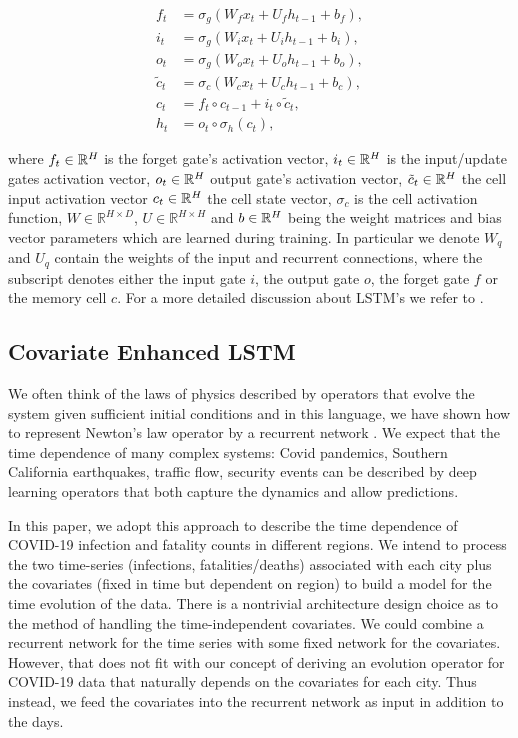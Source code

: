\documentclass[a4paper, inpress]{jds} %
\renewcommand{\_}{%
    \textunderscore\hspace{0pt}%
}
\begin{document}
\begin{align}
    f_t &= \sigma_g(W_f x_t + U_f h_{t-1} + b_f), \label{eq:first} \\
    i_t &= \sigma_g(W_i x_t + U_i h_{t-1} + b_i), \\
    o_t &= \sigma_g(W_o x_t + U_o h_{t-1} + b_o), \\
    \tilde{c}_t &= \sigma_c(W_c x_t + U_c h_{t-1} + b_c), \\
    c_t &= f_t \circ c_{t-1} +i_t \circ \tilde{c}_t,  \\
    h_t &= o_t \circ \sigma_h(c_t) \label{eq:last},
\end{align}

where 
$f_t \in \mathbb{R}^{H}$ is the forget gate's activation vector, 
$i_t \in \mathbb{R}^{H}$ is the input/update gates activation vector, 
$o_{t}\in \mathbb{R}^{H}$ output gate's activation vector, 
$\tilde{c}_{t}\in \mathbb{R}^{H}$ the cell input activation vector
$c_{t}\in \mathbb{R}^{H}$ the cell state vector,  
$\sigma_c$ is the cell activation function, 
$W\in \mathbb {R} ^{H\times D}$, $U\in \mathbb {R} ^{H\times H}$ and $b\in \mathbb{R}^{H}$ being the weight matrices and bias vector parameters which are learned during training.
In particular we denote $W_{q}$ and $U_{q}$ contain the weights of the
input and recurrent connections, where the subscript denotes either
the input gate $i$, the output gate $o$, the forget gate $f$ or the
memory cell $c$. For a more detailed discussion about LSTM's we refer to \cite{lstm-explained}. 



\subsection{Covariate Enhanced LSTM}

We often think of the laws of physics described by operators that
evolve the system given sufficient initial conditions and in this
language, we have shown how to represent Newton’s law operator by a
recurrent network \citep{Kadupitiya2020-zq}. We expect that the time
dependence of many complex systems: Covid pandemics, Southern
California earthquakes, traffic flow, security events can be described
by deep learning operators that both capture the dynamics and allow
predictions. 

In this paper, we adopt this approach to describe the
time dependence of COVID-19 infection and fatality counts in different
regions. 
We intend to
process the two time-series (infections, fatalities/deaths) associated with
each city plus the covariates (fixed in time but dependent on region)
to build a model for the time evolution of the data. There is a
nontrivial architecture design choice as to the method of handling the
time-independent covariates. We could combine a recurrent network for
the time series with some fixed network for the covariates. However,
that does not fit with our concept of deriving an evolution operator
for COVID-19 data that naturally depends on the covariates for each
city. Thus instead, we feed the covariates into the recurrent network as input in addition to the days.
\end{document}
